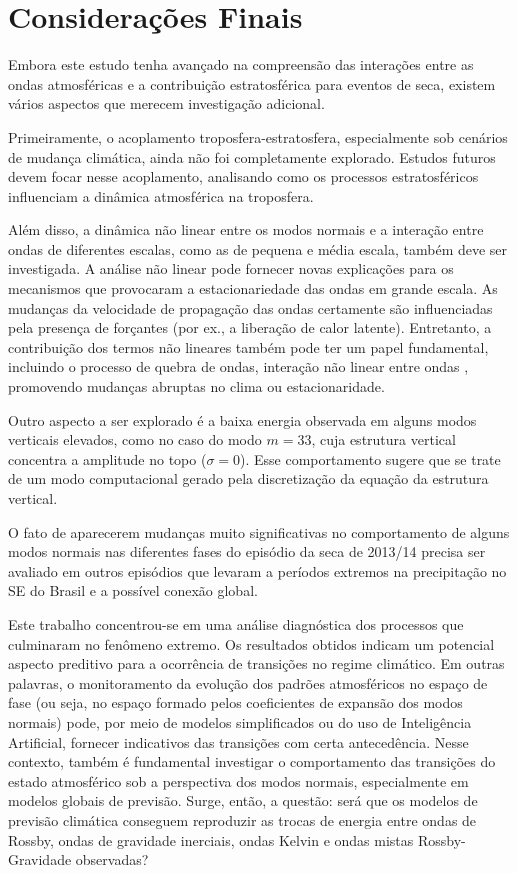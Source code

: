 \chapter{Considerações Finais}\label{cap:Considerações}


Embora este estudo tenha avançado na compreensão das interações entre as ondas atmosféricas e a contribuição estratosférica para eventos de seca, existem vários aspectos que merecem investigação adicional.

Primeiramente, o acoplamento troposfera-estratosfera, especialmente sob cenários de mudança climática, ainda não foi completamente explorado. Estudos futuros devem focar nesse acoplamento, analisando como os processos estratosféricos influenciam a dinâmica atmosférica na troposfera.

Além disso, a dinâmica não linear entre os modos normais e a interação entre ondas de diferentes escalas, como as de pequena e média escala, também deve ser investigada. A análise não linear pode fornecer novas explicações para os mecanismos que provocaram a estacionariedade das ondas em grande escala. As mudanças da velocidade de propagação das ondas certamente são influenciadas pela presença de forçantes (por ex., a liberação de calor latente). Entretanto, a contribuição dos termos não lineares também pode ter um papel fundamental, incluindo o processo de quebra de ondas, interação não linear entre ondas \citep{Enver2017}, promovendo mudanças abruptas no clima ou estacionaridade.

Outro aspecto a ser explorado é a baixa energia observada em alguns modos verticais elevados, como no caso do modo \(m = 33\), cuja estrutura vertical concentra a amplitude no topo (\(\sigma = 0\)). Esse comportamento sugere que se trate de um modo computacional gerado pela discretização da equação da estrutura vertical.

O fato de aparecerem mudanças muito significativas no comportamento de alguns modos normais nas diferentes fases do episódio da seca de 2013/14 precisa ser avaliado em outros episódios que levaram a períodos extremos na precipitação no SE do Brasil e a possível conexão global.

Este trabalho concentrou-se em uma análise diagnóstica dos processos que culminaram no fenômeno extremo. Os resultados obtidos indicam um potencial aspecto preditivo para a ocorrência de transições no regime climático. Em outras palavras, o monitoramento da evolução dos padrões atmosféricos no espaço de fase (ou seja, no espaço formado pelos coeficientes de expansão dos modos normais) pode, por meio de modelos simplificados ou do uso de Inteligência Artificial, fornecer indicativos das transições com certa antecedência. Nesse contexto, também é fundamental investigar o comportamento das transições do estado atmosférico sob a perspectiva dos modos normais, especialmente em modelos globais de previsão. Surge, então, a questão: será que os modelos de previsão climática conseguem reproduzir as trocas de energia entre ondas de Rossby, ondas de gravidade inerciais, ondas Kelvin e ondas mistas Rossby-Gravidade observadas?
